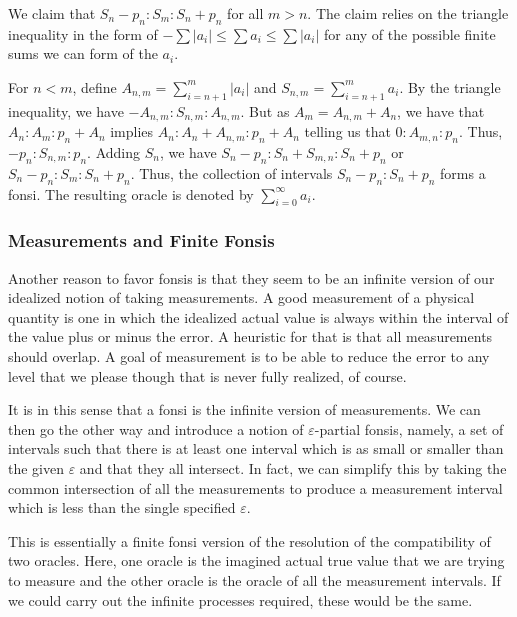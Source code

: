 \documentclass[12pt]{article}
\begin{document}
\begin{itemize}
    We claim that $S_n-p_n: S_m : S_n + p_n$ for all $m > n$.  The claim relies on the triangle inequality in the form of $- \sum |a_i| \leq \sum a_i \leq \sum |a_i| $ for any of the possible finite sums we can form of the $a_i$.

    For $n < m$, define $A_{n,m} = \sum_{i=n+1}^m |a_i|$ and $S_{n,m} = \sum_{i=n+1}^m a_i$. By the triangle inequality, we have $-A_{n,m} : S_{n,m} : A_{n,m}$. But as $A_m = A_{n,m} + A_n $, we have that $A_n:A_m:p_n + A_n$ implies $A_n : A_n+ A_{n,m} : p_n + A_n$ telling us that $0: A_{m,n} : p_n$. Thus, $-p_n : S_{n,m} : p_n$. Adding $S_n$, we have $S_n - p_n : S_n + S_{m,n} : S_n + p_n$  or $S_n - p_n : S_m : S_n + p_n$. Thus, the collection of intervals $S_n-p_n:S_n+p_n$ forms a fonsi. The resulting oracle is denoted by $\sum_{i=0}^\infty a_i$.
\end{itemize}

\subsubsection{Measurements and Finite Fonsis}\label{main:measure}

Another reason to favor fonsis is that they seem to be an infinite version of our idealized notion of taking measurements. A good measurement of a physical quantity is one in which the idealized actual value is always within the interval of the value plus or minus the error. A heuristic for that is that all measurements should overlap. A goal of measurement is to be able to reduce the error to any level that we please though that is never fully realized, of course. 

It is in this sense that a fonsi is the infinite version of measurements. We can then go the other way and introduce a notion of $\varepsilon$-partial fonsis, namely, a set of intervals such that there is at least one interval which is as small or smaller than the given $\varepsilon$ and that they all intersect. In fact, we can simplify this by taking the common intersection of all the measurements to produce a measurement interval which is less than the single specified $\varepsilon$. 

This is essentially a finite fonsi version of the resolution of the compatibility of two oracles. Here, one oracle is the imagined actual true value that we are trying to measure and the other oracle is the oracle of all the measurement intervals. If we could carry out the infinite processes required, these would be the same. 
\end{document}
